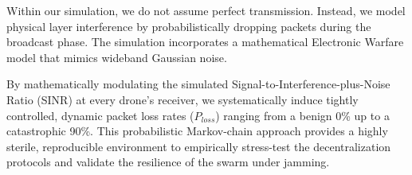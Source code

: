 Within our simulation, we do not assume perfect transmission. Instead, we model physical layer interference by probabilistically dropping packets during the broadcast phase. The simulation incorporates a mathematical Electronic Warfare model that mimics wideband Gaussian noise.

By mathematically modulating the simulated Signal-to-Interference-plus-Noise Ratio (SINR) at every drone's receiver, we systematically induce tightly controlled, dynamic packet loss rates ($P_{loss}$) ranging from a benign 0\% up to a catastrophic 90\%. This probabilistic Markov-chain approach provides a highly sterile, reproducible environment to empirically stress-test the decentralization protocols and validate the resilience of the swarm under jamming.
